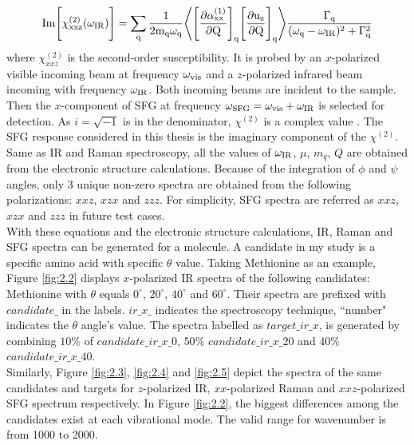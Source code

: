 \begin{equation} \label{eq:2.4}
\rm Im \Bigg\lbrack \chi^{(2)}_{xxz} (\omega_{\rm IR}) \Bigg\rbrack= \sum_{q} \frac{1}{2 m_{q} \omega_{\rm q}} \Bigg \langle \Bigg\lbrack \frac{\partial \alpha_{xx}^{(1)}}{\partial Q} \Bigg\rbrack_{q} \Bigg\lbrack \frac{\partial u_{z}}{\partial Q} \Bigg\rbrack_{q} \Bigg\rangle \frac{\Gamma_q}{(\omega_{\rm q}-\omega_{\rm IR})^{2}+\Gamma_q^{2}}
\end{equation} 
where $\chi^{(2)}_{xxz}$ is the second-order susceptibility. It is probed by an $x$-polarized visible incoming beam at frequency $\omega_{\rm vis}$ and a $z$-polarized infrared beam incoming with frequency $\omega_{\rm IR}$. Both incoming beams are incident to the sample. Then the $x$-component of SFG at frequency $\omega_{\rm SFG}=\omega_{\rm vis}+\omega_{\rm IR}$ is selected for detection. As $i=\sqrt{-1}$ is in the denominator, $\chi^{(2)}$ is a complex value \cite{KuoKaiHung:Thesis:2015}. The SFG response considered in this thesis is the imaginary component of the $\chi^{(2)}$. Same as IR and Raman spectroscopy, all the values of $\omega_{\rm IR}$, $\mu$, $m_q$, $Q$ are obtained from the electronic structure calculations. Because of the integration of $\phi$ and $\psi$ angles, only 3 unique non-zero spectra are obtained from the following polarizations: $xxz$, $xzx$ and $zzz$. For simplicity, SFG spectra are referred as $xxz$, $xzx$ and $zzz$ in future test cases. \\

With these equations and the electronic structure calculations, IR, Raman and SFG spectra can be generated for a molecule. A candidate in my study is a specific amino acid with specific $\theta$ value. Taking Methionine as an example, Figure \ref{fig:2.2} displays $x$-polarized IR spectra of the following candidates: Methionine with $\theta$ equals $0^{\circ}$, $20^{\circ}$, $40^{\circ}$ and $60^{\circ}$. Their spectra are prefixed with $candidate\_$ in the labels. $ir\_x\_$ indicates the spectroscopy technique, ``number" indicates the $\theta$ angle's value. The spectra labelled as $target\_ir\_x$, is generated by combining $10\%$ of $candidate\_ir\_x\_0$, $50\%$ $candidate\_ir\_x\_20$ and $40\%$ $candidate\_ir\_x\_40$. \\

Similarly, Figure \ref{fig:2.3}, \ref{fig:2.4} and \ref{fig:2.5} depict the spectra of the same candidates and targets for $z$-polarized IR, $xx$-polarized Raman and $xxz$-polarized SFG spectrum respectively. In Figure \ref{fig:2.2}, the biggest differences among the candidates exist at each vibrational mode. The valid range for wavenumber is from 1000 to 2000. \\

